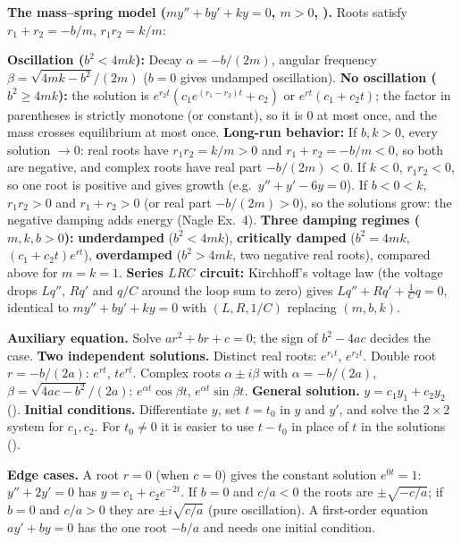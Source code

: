 \documentclass[10pt]{scrartcl}
\newenvironment{howto}[1]{\begin{mdframed}[style=howtostyle,frametitle={#1}]}{\end{mdframed}}
\begin{document}
\noindent\textbf{The mass--spring model ($my''+by'+ky=0$, $m>0$, ).} Roots satisfy $r_1+r_2=-b/m$, $r_1r_2=k/m$:
\begin{itemize}
  \ii \textbf{Oscillation ($b^2<4mk$):} Decay $\alpha=-b/(2m)$, angular frequency $\beta=\sqrt{4mk-b^2}/(2m)$ ($b=0$ gives undamped oscillation).
  \ii \textbf{No oscillation ($b^2\ge 4mk$):} the solution is $e^{r_2t}(c_1e^{(r_1-r_2)t}+c_2)$ or $e^{rt}(c_1+c_2t)$; the factor in parentheses is strictly monotone (or constant), so it is $0$ at most once, and the mass crosses equilibrium at most once.
  \ii \textbf{Long-run behavior:} If $b,k>0$, every solution $\to 0$: real roots have $r_1r_2=k/m>0$ and $r_1+r_2=-b/m<0$, so both are negative, and complex roots have real part $-b/(2m)<0$. If $k<0$, $r_1r_2<0$, so one root is positive and gives growth (e.g.\ $y''+y'-6y=0$). If $b<0<k$, $r_1r_2>0$ and $r_1+r_2>0$ (or real part $-b/(2m)>0$), so the solutions grow: the negative damping adds energy (Nagle Ex.~4).
  \ii \textbf{Three damping regimes ($m,k,b>0$):} \textbf{underdamped} ($b^2<4mk$), \textbf{critically damped} ($b^2=4mk$, $(c_1+c_2t)e^{rt}$), \textbf{overdamped} ($b^2>4mk$, two negative real roots), compared above for $m=k=1$.
  \ii \textbf{Series $LRC$ circuit:} Kirchhoff's voltage law (the voltage drops $Lq''$, $Rq'$ and $q/C$ around the loop sum to zero) gives $Lq''+Rq'+\frac1C q=0$, identical to $my''+by'+ky=0$ with $(L,R,1/C)$ replacing $(m,b,k)$.
\end{itemize}

\begin{howto}{How to solve $ay''+by'+cy=0$ with $y(t_0)=Y_0$, $y'(t_0)=Y_1$}
  \begin{steps}
    \ii \textbf{Auxiliary equation.} Solve $ar^2+br+c=0$; the sign of $b^2-4ac$ decides the case.
    \ii \textbf{Two independent solutions.} Distinct real roots: $e^{r_1t}$, $e^{r_2t}$. Double root $r=-b/(2a)$: $e^{rt}$, $te^{rt}$. Complex roots $\alpha\pm i\beta$ with $\alpha=-b/(2a)$, $\beta=\sqrt{4ac-b^2}/(2a)$: $e^{\alpha t}\cos\beta t$, $e^{\alpha t}\sin\beta t$.
    \ii \textbf{General solution.} $y=c_1y_1+c_2y_2$ ().
    \ii \textbf{Initial conditions.} Differentiate $y$, set $t=t_0$ in $y$ and $y'$, and solve the $2\times 2$ system for $c_1,c_2$. For $t_0\neq 0$ it is easier to use $t-t_0$ in place of $t$ in the solutions ().
  \end{steps}
  \textbf{Edge cases.} A root $r=0$ (when $c=0$) gives the constant solution $e^{0t}=1$: $y''+2y'=0$ has $y=c_1+c_2e^{-2t}$. If $b=0$ and $c/a<0$ the roots are $\pm\sqrt{-c/a}$; if $b=0$ and $c/a>0$ they are $\pm i\sqrt{c/a}$ (pure oscillation). A first-order equation $ay'+by=0$ has the one root $-b/a$ and needs one initial condition.
\end{howto}
\end{document}
